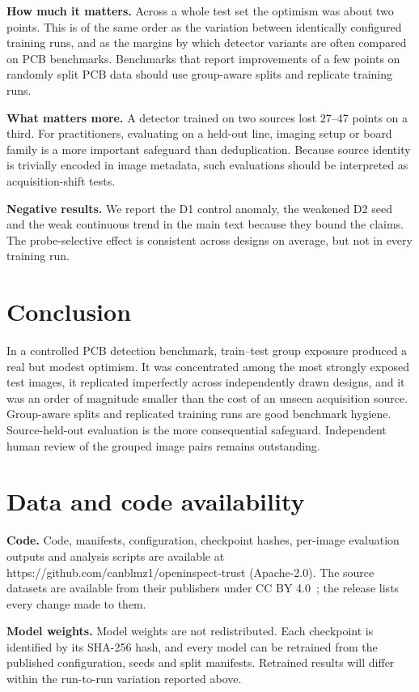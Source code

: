 \documentclass[11pt]{article}
\begin{document}
\textbf{How much it matters.} Across a whole test set the optimism was about two points. This is of the same order as the variation between identically configured training runs, and as the margins by which detector variants are often compared on PCB benchmarks. Benchmarks that report improvements of a few points on randomly split PCB data should use group-aware splits and replicate training runs.

\textbf{What matters more.} A detector trained on two sources lost 27--47 points on a third. For practitioners, evaluating on a held-out line, imaging setup or board family is a more important safeguard than deduplication. Because source identity is trivially encoded in image metadata, such evaluations should be interpreted as acquisition-shift tests.

\textbf{Negative results.} We report the D1 control anomaly, the weakened D2 seed and the weak continuous trend in the main text because they bound the claims. The probe-selective effect is consistent across designs on average, but not in every training run.

\section{Conclusion}
In a controlled PCB detection benchmark, train--test group exposure produced a real but modest optimism. It was concentrated among the most strongly exposed test images, it replicated imperfectly across independently drawn designs, and it was an order of magnitude smaller than the cost of an unseen acquisition source. Group-aware splits and replicated training runs are good benchmark hygiene. Source-held-out evaluation is the more consequential safeguard. Independent human review of the grouped image pairs remains outstanding.

\section{Data and code availability}
\textbf{Code.} Code, manifests, configuration, checkpoint hashes, per-image evaluation outputs and analysis scripts are available at https://github.com/canblmz1/openinspect-trust (Apache-2.0). The source datasets are available from their publishers under CC BY 4.0~\cite{lv2024dspcbsd,yan2026pcbind,rashid2025pcbdefect}; the release lists every change made to them.

\textbf{Model weights.} Model weights are not redistributed. Each checkpoint is identified by its SHA-256 hash, and every model can be retrained from the published configuration, seeds and split manifests. Retrained results will differ within the run-to-run variation reported above.




\end{document}
